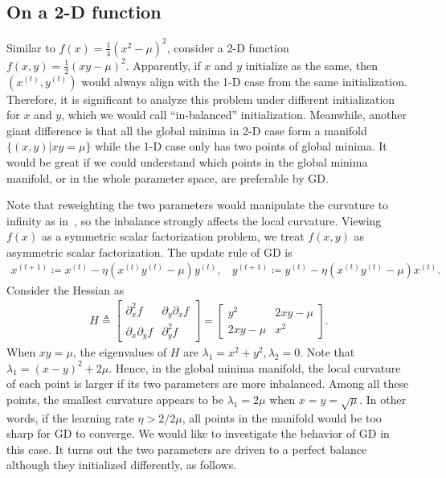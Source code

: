 \documentclass{article}
\newcommand{\citep}[1]{\cite{#1}}
\theoremstyle{plain}
\theoremstyle{remark}
\newcommand{\joan}[1]{}
\def\t{^{(t)}}
\def\tt{^{(t+1)}}
\begin{document}
\subsection{On a 2-D function}\label{sec:2d}


Similar to $f(x)=\frac{1}{4}(x^2-\mu)^2$, consider a 2-D function $f(x,y)=\frac{1}{2}(xy-\mu)^2$. Apparently, if $x$ and $y$ initialize as the same, then $(x\t,y\t)$ would always align with the 1-D case from the same initialization. Therefore, it is significant to analyze this problem under different initialization for $x$ and $y$, which we would call ``in-balanced'' initialization. Meanwhile, another giant difference is that all the global minima in 2-D case form a manifold $\{(x,y)|xy=\mu\}$ while the 1-D case only has two points of global minima. It would be great if we could understand which points in the global minima manifold, or in the whole parameter space, are preferable by GD. 

Note that reweighting the two parameters would manipulate the curvature to infinity as in~\citep{elkabetz2021continuous}, 
so the inbalance strongly affects the local curvature.
Viewing $f(x)$ as a symmetric scalar factorization problem, we treat $f(x,y)$ as asymmetric scalar factorization. The update rule of GD is 
\begin{align}
    x\tt \coloneqq x\t - \eta (x\t y\t-\mu)y\t,~~~~
    y\tt \coloneqq y\t - \eta (x\t y\t-\mu)x\t.
\end{align}
Consider the Hessian as
\begin{align}
    H\triangleq 
    \begin{bmatrix}
    \partial_x^2 f &  \partial_y\partial_x f \\
    \partial_x\partial_y f &  \partial_y^2 f
    \end{bmatrix}
    =
    \begin{bmatrix}
    y^2 & 2xy-\mu \\
    2xy-\mu & x^2
    \end{bmatrix}.\label{eq:2dhessian}
\end{align}
When $xy=\mu$, the eigenvalues of $H$ are $\lambda_1 = x^2+y^2, \lambda_2 = 0$. Note that $\lambda_1 = (x-y)^2+2\mu$. Hence, in the global minima manifold, the local curvature of each point is larger if its two parameters are more inbalanced. Among all these points, the smallest curvature appears to be $\lambda_1 = 2\mu$ when $x=y=\sqrt{\mu}$. In other words, if the learning rate $\eta>2/2\mu$, all points in the manifold would be too sharp for GD to converge. We would like to investigate the behavior of GD in this case. It turns out the two parameters are driven to a perfect balance although they initialized differently, as follows.
\end{document}
